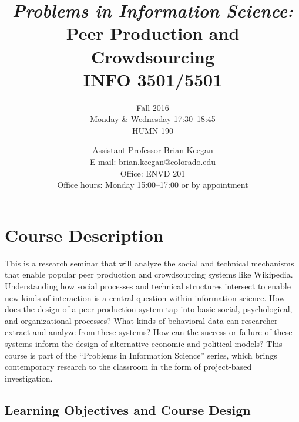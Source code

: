 \documentclass[11pt]{memoir}
\makeatletter
\def\myauthor{Brian Keegan}
\def\mycoursename{Peer Production and Crowdsourcing}
\def\mycourselisting{INFO 3501/5501}
\def\myoffice{ENVD 201}
\def\myclassroom{HUMN 190}
\def\mymeetingtime{Monday \& Wednesday 17:30--18:45}
\def\mydate{Fall 2016}
\def\myemail{brian.keegan@colorado.edu}
\def\myofficehours{Monday 15:00--17:00 or by appointment}
\def\mytitle{Assistant Professor }
\makeatother
\begin{document}
\nobibliography*


\title{
    \textit{\normalsize{\textcolor{CUGold}{\textbf{Problems in Information Science:}}}}\\
    \textbf{\huge{\mycoursename}}\\
    \vspace{5pt} \normalsize{\mycourselisting}
    }

\author{\mydate\\ \mymeetingtime\\ \myclassroom}

\date{\normalsize{\mytitle \myauthor\\
       E-mail: \href{mailto:\myemail}{\myemail}\\
       Office: \myoffice\\
       Office hours: \myofficehours}}

\maketitle


\section{\textbf{Course Description}}

This is a research seminar that will analyze the social and technical mechanisms that enable popular peer production and crowdsourcing systems like Wikipedia. Understanding how social processes and technical structures intersect to enable new kinds of interaction is a central question within information science. How does the design of a peer production system tap into basic social, psychological, and organizational processes? What kinds of behavioral data can researcher extract and analyze from these systems? How can the success or failure of these systems inform the design of alternative economic and political models? This course is part of the ``Problems in Information Science'' series, which brings contemporary research to the classroom in the form of project-based investigation.

\subsection{Learning Objectives and Course Design}
\end{document}
